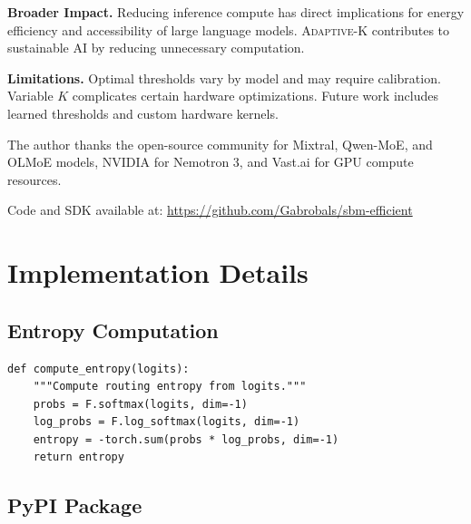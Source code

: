\documentclass{article}
\newcommand{\adaptivek}{\textsc{Adaptive-K}}
\begin{document}
\textbf{Broader Impact.} Reducing inference compute has direct implications for energy efficiency and accessibility of large language models. \adaptivek{} contributes to sustainable AI by reducing unnecessary computation.

\textbf{Limitations.} Optimal thresholds vary by model and may require calibration. Variable $K$ complicates certain hardware optimizations. Future work includes learned thresholds and custom hardware kernels.

\begin{ack}
The author thanks the open-source community for Mixtral, Qwen-MoE, and OLMoE models, NVIDIA for Nemotron 3, and Vast.ai for GPU compute resources.

Code and SDK available at: \url{https://github.com/Gabrobals/sbm-efficient}
\end{ack}




\appendix

\section{Implementation Details}
\label{app:implementation}

\subsection{Entropy Computation}

\begin{verbatim}
def compute_entropy(logits):
    """Compute routing entropy from logits."""
    probs = F.softmax(logits, dim=-1)
    log_probs = F.log_softmax(logits, dim=-1)
    entropy = -torch.sum(probs * log_probs, dim=-1)
    return entropy
\end{verbatim}

\subsection{PyPI Package}
\end{document}
